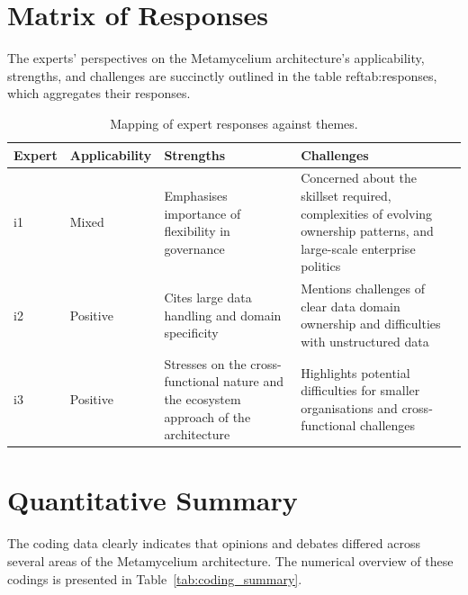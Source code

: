 \documentclass[journal]{IEEEtran}
\begin{document}
\section{Matrix of Responses} \label{expertOpinion_matrixResponses}

The experts' perspectives on the Metamycelium architecture's applicability, strengths, and challenges are succinctly outlined in the table reftab:responses, which aggregates their responses.

\begin{table}[h]
  \centering
  \caption{Mapping of expert responses against themes.}
  \begin{tabularx}{\textwidth}{llXX}
  \toprule
  Expert & Applicability & Strengths & Challenges \\
  \midrule
  i1 & Mixed & Emphasises importance of flexibility in governance & Concerned about the skillset required, complexities of evolving ownership patterns, and large-scale enterprise politics \\
  i2 & Positive & Cites large data handling and domain specificity & Mentions challenges of clear data domain ownership and difficulties with unstructured data \\
  i3 & Positive & Stresses on the cross-functional nature and the ecosystem approach of the architecture & Highlights potential difficulties for smaller organisations and cross-functional challenges \\
  \bottomrule
  \end{tabularx}
  \label{tab:responses}
\end{table}

\section{Quantitative Summary} \label{expertOpinion_quantitativeSummary}


The coding data clearly indicates that opinions and debates differed across several areas of the Metamycelium architecture. The numerical overview of these codings is presented in Table~\ref{tab:coding_summary}.
\end{document}
